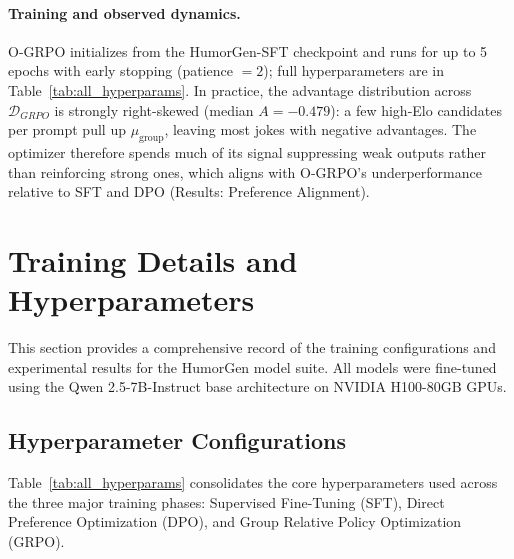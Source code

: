 \documentclass[11pt]{article}
\begin{document}
\paragraph{Training and observed dynamics.}
O-GRPO initializes from the HumorGen-SFT checkpoint and runs for up to 5 epochs with early stopping (patience $=2$); full hyperparameters are in Table~\ref{tab:all_hyperparams}. In practice, the advantage distribution across $\mathcal{D}_{GRPO}$ is strongly right-skewed (median $A = -0.479$): a few high-Elo candidates per prompt pull up $\mu_{\mathrm{group}}$, leaving most jokes with negative advantages. The optimizer therefore spends much of its signal suppressing weak outputs rather than reinforcing strong ones, which aligns with O-GRPO's underperformance relative to SFT and DPO (Results: Preference Alignment).

\section{Training Details and Hyperparameters}
\label{sec:appendix_hyperparameters}
This section provides a comprehensive record of the training configurations and experimental results for the HumorGen model suite. All models were fine-tuned using the Qwen 2.5-7B-Instruct base architecture on NVIDIA H100-80GB GPUs.

\subsection{Hyperparameter Configurations}
\label{sec:appendix_hyperparams_config}
Table~\ref{tab:all_hyperparams} consolidates the core hyperparameters used across the three major training phases: Supervised Fine-Tuning (SFT), Direct Preference Optimization (DPO), and Group Relative Policy Optimization (GRPO).
\end{document}

